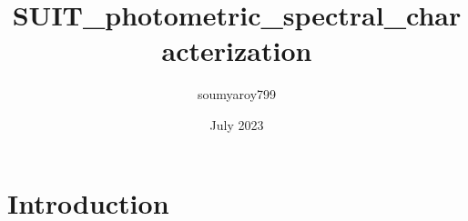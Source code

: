 \documentclass{article}
\title{SUIT_photometric_spectral_characterization}
\author{soumyaroy799 }
\date{July 2023}
\begin{document}
\maketitle

\section{Introduction}
\end{document}
